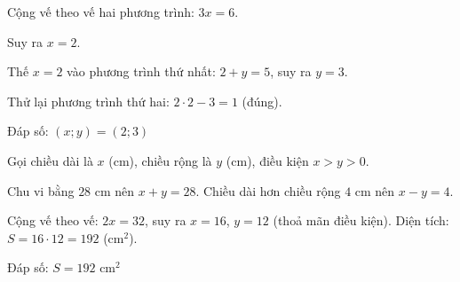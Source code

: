 \begin{problem}[9DS-HPT-001]
Cộng vế theo vế hai phương trình: $3x = 6$.

Suy ra $x = 2$.

Thế $x = 2$ vào phương trình thứ nhất: $2 + y = 5$, suy ra $y = 3$.

Thử lại phương trình thứ hai: $2 \cdot 2 - 3 = 1$ (đúng).

Đáp số: $(x; y) = (2; 3)$
\end{problem}

\begin{problem}[9DS-HPT-007]
Gọi chiều dài là $x$ (cm), chiều rộng là $y$ (cm), điều kiện $x > y > 0$.

Chu vi bằng $28$ cm nên $x + y = 28$. Chiều dài hơn chiều rộng $4$ cm nên $x - y = 4$.

Cộng vế theo vế: $2x = 32$, suy ra $x = 16$, $y = 12$ (thoả mãn điều kiện). Diện tích: $S = 16 \cdot 12 = 192$ (cm$^2$).

Đáp số: $S = 192$ cm$^2$
\end{problem}
